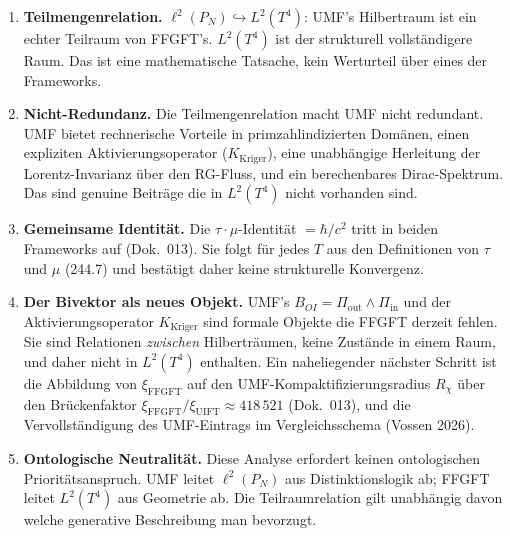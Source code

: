 \begin{enumerate}

  \item \textbf{Teilmengenrelation.}
    $\ell^2(P_N) \hookrightarrow L^2(T^4)$: UMF's Hilbertraum ist ein echter
    Teilraum von FFGFT's. $L^2(T^4)$ ist der strukturell vollständigere Raum.
    Das ist eine mathematische Tatsache, kein Werturteil über eines der
    Frameworks.

  \item \textbf{Nicht-Redundanz.}
    Die Teilmengenrelation macht UMF nicht redundant. UMF bietet rechnerische
    Vorteile in primzahlindizierten Domänen, einen expliziten Aktivierungsoperator
    ($K_\text{Kriger}$), eine unabhängige Herleitung der Lorentz-Invarianz über
    den RG-Fluss, und ein berechenbares Dirac-Spektrum. Das sind genuine Beiträge
    die in $L^2(T^4)$ nicht vorhanden sind.

  \item \textbf{Gemeinsame Identität.}
    Die \texorpdfstring{$\tau\cdot\mu$}{tau.mu}-Identität $= \hbar/c^2$
    tritt in beiden Frameworks auf (Dok.~013). Sie folgt für jedes $T$ aus den
    Definitionen von $\tau$ und $\mu$ (244.7) und bestätigt daher keine
    strukturelle Konvergenz.

  \item \textbf{Der Bivektor als neues Objekt.}
    UMF's $B_{OI} = \Pi_\text{out} \wedge \Pi_\text{in}$ und der
    Aktivierungsoperator $K_\text{Kriger}$ sind formale Objekte die FFGFT
    derzeit fehlen. Sie sind Relationen \emph{zwischen} Hilberträumen, keine
    Zustände in einem Raum, und daher nicht in $L^2(T^4)$ enthalten. Ein
    naheliegender nächster Schritt ist die Abbildung von $\xi_\text{FFGFT}$
    auf den UMF-Kompaktifizierungsradius $R_\chi$ über den Brückenfaktor
    $\xi_\text{FFGFT}/\xi_\text{UIFT} \approx 418\,521$ (Dok.~013),
    und die Vervollständigung des UMF-Eintrags im Vergleichsschema
    (Vossen 2026).

  \item \textbf{Ontologische Neutralität.}
    Diese Analyse erfordert keinen ontologischen Prioritätsanspruch. UMF leitet
    $\ell^2(P_N)$ aus Distinktionslogik ab; FFGFT leitet $L^2(T^4)$ aus
    Geometrie ab. Die Teilraumrelation gilt unabhängig davon welche generative
    Beschreibung man bevorzugt.

\end{enumerate}
